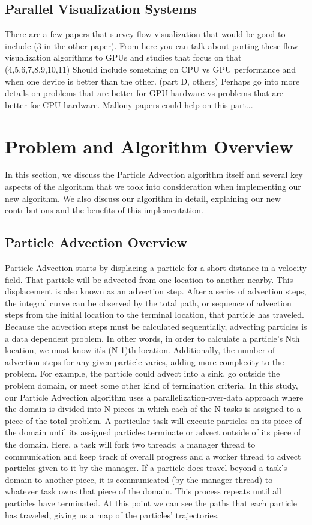\documentclass{IEEEtran}
\begin{document}
\subsection{Parallel Visualization Systems}
There are a few papers that survey flow visualization that would be good to include (3 in the other paper).
%
From here you can talk about porting these flow visualization algorithms to GPUs and studies that focus on that (4,5,6,7,8,9,10,11)
%
Should include something on CPU vs GPU performance and when one device is better than the other. (part D, others)
%
Perhaps go into more details on problems that are better for GPU hardware vs problems that are better for CPU hardware.
%
Mallony papers could help on this part...
%
\section{Problem and Algorithm Overview}
In this section, we discuss the Particle Advection algorithm itself and several key aspects of the algorithm that we took into consideration when implementing our new algorithm. 
%
We also discuss our algorithm in detail, explaining our new contributions and the benefits of this implementation.
%
\subsection{Particle Advection Overview}
Particle Advection starts by displacing a particle for a short distance in a velocity field.
%
That particle will be advected from one location to another nearby.
%
This displacement is also known as an advection step.
%
After a series of advection steps, the integral curve can be observed by the total path, or sequence of advection steps from the initial location to the terminal location, that particle has traveled.
%
Because the advection steps must be calculated sequentially, advecting particles is a data dependent problem.
%
In other words, in order to calculate a particle's Nth location, we must know it's (N-1)th location.
%
Additionally, the number of advection steps for any given particle varies, adding more complexity to the problem.
%
For example, the particle could advect into a sink, go outside the problem domain, or meet some other kind of termination criteria.
%
In this study, our Particle Advection algorithm uses a parallelization-over-data approach where the domain is divided into N pieces in which each of the N tasks is assigned to a piece of the total problem.
%
A particular task will execute particles on its piece of the domain until its assigned particles terminate or advect outside of its piece of the domain.
%
Here, a task will fork two threads: a manager thread to communication and keep track of overall progress and a worker thread to advect particles given to it by the manager.
%
If a particle does travel beyond a task's domain to another piece, it is communicated (by the manager thread) to whatever task owns that piece of the domain.
%
This process repeats until all particles have terminated.
%
At this point we can see the paths that each particle has traveled, giving us a map of the particles' trajectories.
%
\end{document}
